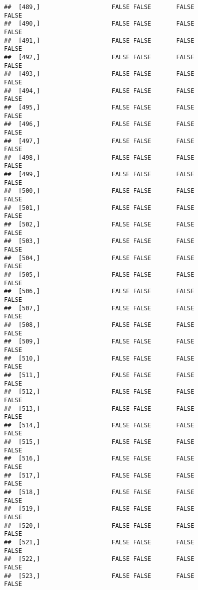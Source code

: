 \documentclass[
]{article}
\begin{document}
\begin{verbatim}
##  [489,]                    FALSE FALSE       FALSE                FALSE
##  [490,]                    FALSE FALSE       FALSE                FALSE
##  [491,]                    FALSE FALSE       FALSE                FALSE
##  [492,]                    FALSE FALSE       FALSE                FALSE
##  [493,]                    FALSE FALSE       FALSE                FALSE
##  [494,]                    FALSE FALSE       FALSE                FALSE
##  [495,]                    FALSE FALSE       FALSE                FALSE
##  [496,]                    FALSE FALSE       FALSE                FALSE
##  [497,]                    FALSE FALSE       FALSE                FALSE
##  [498,]                    FALSE FALSE       FALSE                FALSE
##  [499,]                    FALSE FALSE       FALSE                FALSE
##  [500,]                    FALSE FALSE       FALSE                FALSE
##  [501,]                    FALSE FALSE       FALSE                FALSE
##  [502,]                    FALSE FALSE       FALSE                FALSE
##  [503,]                    FALSE FALSE       FALSE                FALSE
##  [504,]                    FALSE FALSE       FALSE                FALSE
##  [505,]                    FALSE FALSE       FALSE                FALSE
##  [506,]                    FALSE FALSE       FALSE                FALSE
##  [507,]                    FALSE FALSE       FALSE                FALSE
##  [508,]                    FALSE FALSE       FALSE                FALSE
##  [509,]                    FALSE FALSE       FALSE                FALSE
##  [510,]                    FALSE FALSE       FALSE                FALSE
##  [511,]                    FALSE FALSE       FALSE                FALSE
##  [512,]                    FALSE FALSE       FALSE                FALSE
##  [513,]                    FALSE FALSE       FALSE                FALSE
##  [514,]                    FALSE FALSE       FALSE                FALSE
##  [515,]                    FALSE FALSE       FALSE                FALSE
##  [516,]                    FALSE FALSE       FALSE                FALSE
##  [517,]                    FALSE FALSE       FALSE                FALSE
##  [518,]                    FALSE FALSE       FALSE                FALSE
##  [519,]                    FALSE FALSE       FALSE                FALSE
##  [520,]                    FALSE FALSE       FALSE                FALSE
##  [521,]                    FALSE FALSE       FALSE                FALSE
##  [522,]                    FALSE FALSE       FALSE                FALSE
##  [523,]                    FALSE FALSE       FALSE                FALSE

\end{verbatim}
\end{document}
